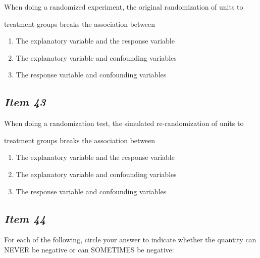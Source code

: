 When doing a randomized experiment, the original randomization of units to


treatment groups breaks the association between


\begin{enumerate} [leftmargin=2cm, itemsep=.2em]


\item The explanatory variable and the response variable


\item The explanatory variable and confounding variables


\item The response variable and confounding variables


\end{enumerate}





\subsection{\textbf{\textit{Item 43}}}


When doing a randomization test, the simulated re-randomization of units to


treatment groups breaks the association between


\begin{enumerate} [leftmargin=2cm, itemsep=.2em]


\item The explanatory variable and the response variable


\item The explanatory variable and confounding variables


\item The response variable and confounding variables


\end{enumerate}





\subsection{\textbf{\textit{Item 44}}}


For each of the following, circle your answer to indicate whether the quantity can NEVER be negative or can SOMETIMES be negative:


